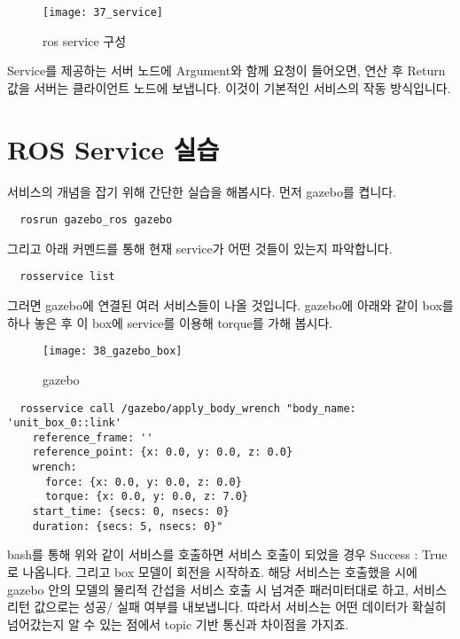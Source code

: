 \documentclass[11pt,fleqn]{book} %
\begin{document}
\begin{figure}[h]
\centering\texttt{[image: 37\_service]}
\caption{ros service 구성}
\end{figure}

Service를 제공하는 서버 노드에 Argument와 함께 요청이 들어오면, 연산 후 Return 값을 서버는 클라이언트 노드에 보냅니다.
이것이 기본적인 서비스의 작동 방식입니다.

\section{ROS Service 실습}

서비스의 개념을 잡기 위해 간단한 실습을 해봅시다. 먼저 gazebo를 켭니다.

\begin{verbatim}
  rosrun gazebo_ros gazebo
\end{verbatim}

그리고 아래 커멘드를 통해 현재 service가 어떤 것들이 있는지 파악합니다.

\begin{verbatim}
  rosservice list
\end{verbatim}

그러면 gazebo에 연결된 여러 서비스들이 나올 것입니다. gazebo에 아래와 같이 box를 하나 놓은 후
이 box에 service를 이용해 torque를 가해 봅시다.

\begin{figure}[h]
\centering\texttt{[image: 38\_gazebo\_box]}
\caption{gazebo}
\end{figure}

\begin{verbatim}
  rosservice call /gazebo/apply_body_wrench "body_name: 'unit_box_0::link'
    reference_frame: ''
    reference_point: {x: 0.0, y: 0.0, z: 0.0}
    wrench:
      force: {x: 0.0, y: 0.0, z: 0.0}
      torque: {x: 0.0, y: 0.0, z: 7.0}
    start_time: {secs: 0, nsecs: 0}
    duration: {secs: 5, nsecs: 0}"
\end{verbatim}

bash를 통해 위와 같이 서비스를 호출하면 서비스 호출이 되었을 경우 Success : True 로 나옵니다.
그리고 box 모델이 회전을 시작하죠.
해당 서비스는 호출했을 시에 gazebo 안의 모델의 물리적 간섭을 서비스 호출 시 넘겨준 패러미터대로 하고,
서비스 리턴 값으로는 성공/ 실패 여부를 내보냅니다. 따라서 서비스는 어떤 데이터가 확실히 넘어갔는지 알 수 있는 점에서 topic 기반 통신과 차이점을 가지죠.
\end{document}
